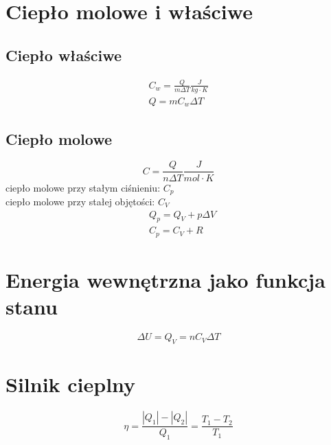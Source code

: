   \section{Ciepło molowe i właściwe}
    \subsection{Ciepło właściwe}
      \begin{gather}
        C_w = \frac{Q}{m\Delta T} \unit{\frac{J}{kg\cdot K}}\\
        Q = mC_w\Delta T
      \end{gather}
    \subsection{Ciepło molowe}
      \begin{equation}
        C = \frac{Q}{n\Delta T} \unit{\frac{J}{mol\cdot K}}
      \end{equation}
      ciepło molowe przy stałym ciśnieniu: $C_p$\\
      ciepło molowe przy stałej objętości: $C_V$
      \begin{align}
        &Q_p = Q_V + p\Delta V\\
        &C_p = C_V + R
      \end{align}
  \section{Energia wewnętrzna jako funkcja stanu}
    \begin{equation}
      \Delta U = Q_V = nC_V\Delta T
    \end{equation}
    \section{Silnik cieplny}
    \begin{equation}
      \eta = \frac{|Q_1|-|Q_2|}{Q_1} = \frac{T_1 - T_2}{T_1}
    \end{equation}

